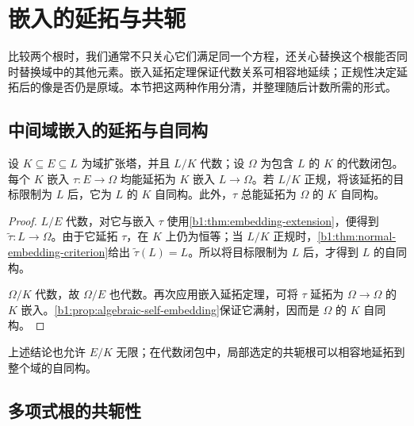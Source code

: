 
\section{嵌入的延拓与共轭}
\label{b1:sec:1504}


%
%
%

比较两个根时，我们通常不只关心它们满足同一个方程，还关心替换这个根能否同时替换域中的其他元素。嵌入延拓定理保证代数关系可相容地延续；正规性决定延拓后的像是否仍是原域。本节把这两种作用分清，并整理随后计数所需的形式。

\subsection{中间域嵌入的延拓与自同构}
\label{b1:subsec:1504:01}

\begin{corollary}\label{b1:cor:intermediate-embedding-extension}
	设 \(K\subseteq E\subseteq L\) 为域扩张塔，并且 \(L/K\) 代数；设 \(\Omega\) 为包含 \(L\) 的 \(K\) 的代数闭包。每个 \(K\) 嵌入 \(\tau:E\rightarrow\Omega\) 均能延拓为 \(K\) 嵌入 \(L\rightarrow\Omega\)。若 \(L/K\) 正规，将该延拓的目标限制为 \(L\) 后，它为 \(L\) 的 \(K\) 自同构。此外，\(\tau\) 总能延拓为 \(\Omega\) 的 \(K\) 自同构。
\end{corollary}
\begin{proof}
	\(L/E\) 代数，对它与嵌入 \(\tau\) 使用\cref{b1:thm:embedding-extension}，便得到 \(\widetilde\tau:L\rightarrow\Omega\)。由于它延拓 \(\tau\)，在 \(K\) 上仍为恒等；当 \(L/K\) 正规时，\cref{b1:thm:normal-embedding-criterion}给出 \(\widetilde\tau(L)=L\)。所以将目标限制为 \(L\) 后，才得到 \(L\) 的自同构。

	\(\Omega/K\) 代数，故 \(\Omega/E\) 也代数。再次应用嵌入延拓定理，可将 \(\tau\) 延拓为 \(\Omega\rightarrow\Omega\) 的 \(K\) 嵌入。\cref{b1:prop:algebraic-self-embedding}保证它满射，因而是 \(\Omega\) 的 \(K\) 自同构。
\end{proof}
上述结论也允许 \(E/K\) 无限；在代数闭包中，局部选定的共轭根可以相容地延拓到整个域的自同构。

\subsection{多项式根的共轭性}
\label{b1:subsec:1504:02}

